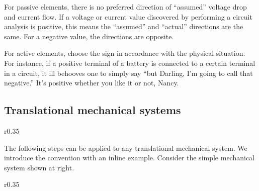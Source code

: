 \documentclass[dynamic_systems.tex]{subfiles}
\begin{document}
For passive elements, there is no preferred direction of ``assumed'' voltage drop and current flow.
If a voltage or current value discovered by performing a circuit analysis is positive, this means the ``assumed'' and ``actual'' directions are the same. For a negative value, the directions are opposite.

For active elements, choose the sign in accordance with the physical situation.
For instance, if a positive terminal of a battery is connected to a certain terminal in a circuit, it ill behooves one to simply say ``but Darling, I'm going to call that negative.''
It's positive whether you like it or not, Nancy.
\tags{}

\subsection{Translational mechanical systems}
\tags{}

\begingroup
\setlength\intextsep{0pt}
\begin{wrapfigure}[4]{r}{0.35\textwidth}
  \centering
\end{wrapfigure}

The following steps can be applied to any translational mechanical system.
We introduce the convention with an inline example.
Consider the simple mechanical system shown at right.
\tags{}
\endgroup

\begingroup
\setlength\intextsep{0pt}
\begin{wrapfigure}[4]{r}{0.35\textwidth}
  \centering
\end{wrapfigure}
\end{document}
